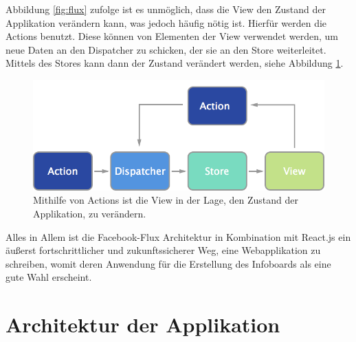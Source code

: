 \documentclass[12pt,twoside]{book}
\begin{document}
Abbildung \ref{fig:flux} zufolge ist es unmöglich, dass die View den Zustand der Applikation verändern kann, was jedoch häufig nötig ist. Hierfür werden die Actions benutzt. Diese können von Elementen der View verwendet werden, um neue Daten an den Dispatcher zu schicken, der sie an den Store weiterleitet. Mittels des Stores kann dann der Zustand verändert werden, siehe Abbildung \ref{fig:flux_actions}.

\begin{figure}[htbp]
    \centering
    \includegraphics[width=1.0\textwidth]{images/flux_actions.png}
    \caption{Mithilfe von Actions ist die View in der Lage, den Zustand der Applikation, zu verändern.}
    \label{fig:flux_actions}
\end{figure}

Alles in Allem ist die Facebook-Flux Architektur in Kombination mit React.js ein äußerst fortschrittlicher und zukunftssicherer Weg, eine Webapplikation zu schreiben, womit deren Anwendung für die Erstellung des Infoboards als eine gute Wahl erscheint.

\section{Architektur der Applikation}
\end{document}
